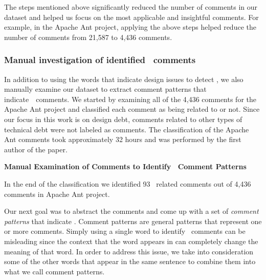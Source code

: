 The steps mentioned above significantly reduced the number of comments in our dataset and helped us focus on the most applicable and insightful comments. For example, in the Apache Ant project, applying the above steps helped reduce the number of comments from 21,587 to 4,436 comments.


\subsubsection{Manual investigation of identified \SADTD~comments} 

In addition to using the words that indicate design issues to detect \SADTD, we also manually examine our dataset to extract comment patterns that indicate~\SADTD~comments. We started by examining all of the 4,436 comments for the Apache Ant project and classified each comment as being related to \SADTD or not. Since our focus in this work is on design debt, comments related to other types of technical debt were not labeled as \SADTD comments. The classification of the Apache Ant comments took approximately 32 hours and was performed by the first author of the paper.

\noindent \textbf{Manual Examination of Comments to Identify \SADTD~Comment Patterns}

In the end of the classification we identified 93 \SADTD~related comments out of 4,436 comments in Apache Ant project.

Our next goal was to abstract the comments and come up with a set of \emph{comment patterns} that indicate \SADTD. Comment patterns are general patterns that represent one or more comments. Simply using a single word to identify \SADTD~comments can be misleading since the context that the word appears in can completely change the meaning of that word. In order to address this issue, we take into consideration some of the other words that appear in the same sentence to combine them into what we call comment patterns. 



